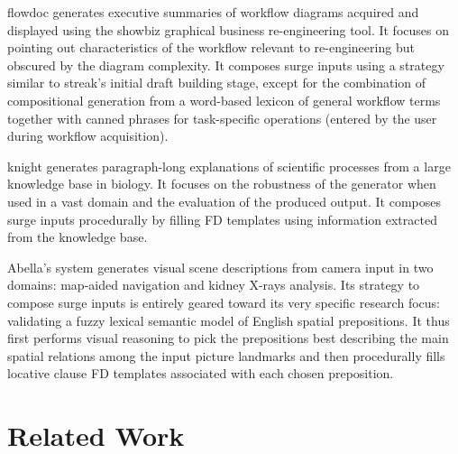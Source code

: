 {\sc flowdoc} \cite{flowdoc} generates executive summaries of workflow diagrams
  acquired and displayed using the {\sc showbiz} \cite{showbiz} graphical
  business re-engineering tool. It focuses on pointing out characteristics of
  the workflow relevant to re-engineering but obscured by the diagram
  complexity. It composes {\sc surge} inputs using a strategy similar to {\sc
  streak}'s initial draft building stage, except for the combination
  of compositional generation from a word-based lexicon of general workflow
  terms together with canned phrases for task-specific operations (entered
  by the user during workflow acquisition).

{\sc knight} \cite{lester-phd} generates paragraph-long explanations of
  scientific processes from a large knowledge base in biology. It focuses on
  the robustness of the generator when used in a vast domain and the evaluation
  of the produced output. It composes {\sc surge} inputs procedurally by
  filling FD templates using information extracted from the knowledge base.

Abella's system \cite{abella-phd} generates visual scene descriptions from
camera input in two domains: map-aided navigation and kidney X-rays
analysis. Its strategy to compose {\sc surge} inputs is entirely geared toward
its very specific research focus: validating a fuzzy lexical semantic model of
English spatial prepositions.  It thus first performs visual reasoning to pick
the prepositions best describing the main spatial relations among the input
picture landmarks and then procedurally fills locative clause FD templates
associated with each chosen preposition.

%


\section{Related Work} 
\label{related-work}

